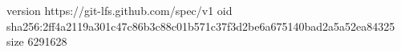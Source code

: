 version https://git-lfs.github.com/spec/v1
oid sha256:2ff4a2119a301c47c86b3c88c01b571c37f3d2be6a675140bad2a5a52ea84325
size 6291628
